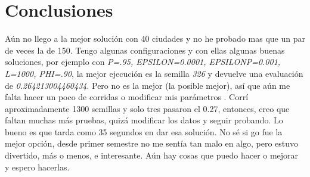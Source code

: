 \documentclass[
10pt,
a4paper,
oneside,
headinclude,footinclude,
BCOR5mm,
]{article}
\begin{document}
\section{Conclusiones}
Aún no llego a la mejor solución con 40 ciudades y no he probado mas que un par
de veces la de 150. Tengo algunas configuraciones y con ellas algunas buenas
soluciones, por ejemplo con \textit{P=.95, EPSILON=0.0001, EPSILONP=0.001,
  L=1000, PHI=.90}, la mejor ejecución es la semilla \textit{326} y devuelve una
evaluación  de \textit{0.264213004460434}. Pero no es la mejor (la posible
mejor), así que aún me falta hacer un poco de corridas o modificar mis parámetros
. Corrí aproximadamente 1300 semillas y solo tres pasaron el 0.27, entonces, creo
que faltan muchas más pruebas, quizá modificar los datos y seguir probando. Lo
bueno es que tarda como 35 segundos en dar esa solución.
No sé si go fue la mejor opción, desde primer semestre no me sentía tan malo en
algo, pero estuvo divertido, más o menos, e interesante. Aún hay cosas que puedo
hacer o mejorar y espero hacerlas.

{
  \nocite{canek}
  \nocite{papadimitriou}
}

\end{document}
